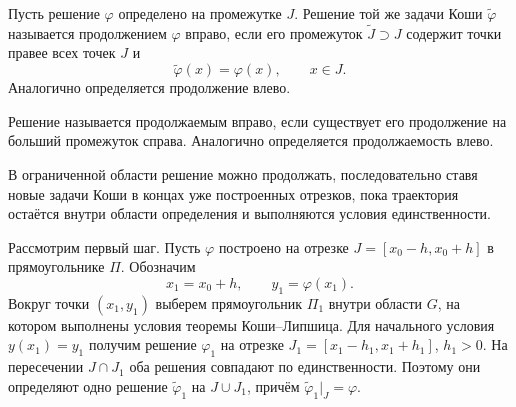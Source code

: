 \documentclass[12pt,a4paper]{article}
\numberwithin{equation}{section}
\begin{document}
\begin{definitionHSE}
Пусть решение $\varphi$ определено на промежутке $J$. Решение той же
задачи Коши $\widetilde\varphi$ называется продолжением $\varphi$
вправо, если его промежуток $\widetilde J\supset J$ содержит точки
правее всех точек $J$ и
\[
\widetilde\varphi(x)=\varphi(x),\qquad x\in J.
\]
Аналогично определяется продолжение влево.
\end{definitionHSE}

\begin{definitionHSE}
Решение называется продолжаемым вправо, если существует его продолжение на больший промежуток справа. Аналогично определяется продолжаемость влево.
\end{definitionHSE}

В ограниченной области решение можно продолжать, последовательно ставя новые задачи Коши в концах уже построенных отрезков, пока траектория остаётся внутри области определения и выполняются условия единственности.

Рассмотрим первый шаг. Пусть \(\varphi\) построено на отрезке
\(J=[x_0-h,x_0+h]\) в прямоугольнике \(\Pi\). Обозначим
\[
 x_1=x_0+h,\qquad y_1=\varphi(x_1).
\]
Вокруг точки \((x_1,y_1)\) выберем прямоугольник \(\Pi_1\) внутри
области \(G\), на котором выполнены условия теоремы Коши--Липшица.
Для начального условия \(y(x_1)=y_1\) получим решение \(\varphi_1\)
на отрезке \(J_1=[x_1-h_1,x_1+h_1]\), \(h_1>0\).
На пересечении \(J\cap J_1\) оба решения совпадают по единственности.
Поэтому они определяют одно решение \(\widetilde\varphi_1\) на
\(J\cup J_1\), причём \(\widetilde\varphi_1|_J=\varphi\).

\begin{center}
\end{center}
\end{document}

